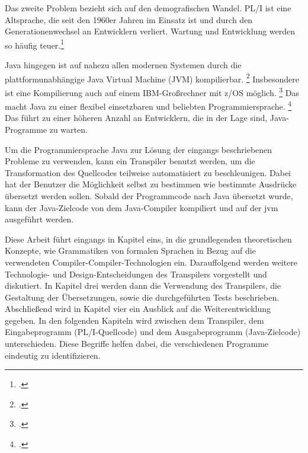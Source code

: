 Das zweite Problem bezieht sich auf den demografischen Wandel. PL/I ist eine Altsprache, die seit den 1960er Jahren im Einsatz ist und durch den Generationenwechsel an Entwicklern verliert. Wartung und Entwicklung werden so häufig teuer.\footcite[Vgl. ][S. 227ff.]{histopli} 

Java hingegen ist auf nahezu allen modernen Systemen durch die plattformunabhängige Java Virtual Machine (JVM) kompilierbar. \footcite[Vgl. ][]{jvm}
Insbesondere ist eine Kompilierung auch auf einem IBM-Großrechner mit z/OS möglich. \footcite[Vgl. ][]{zos} 
Das macht Java zu einer flexibel einsetzbaren und beliebten Programmiersprache. \footcite[Vgl. ][]{tiobe} Das führt zu einer höheren Anzahl an Entwicklern, die in der Lage sind, Java-Programme zu warten.

Um die Programmiersprache Java zur Lösung der eingangs beschriebenen Probleme zu verwenden, kann ein Transpiler benutzt werden, um die Transformation des Quellcodes teilweise automatisiert zu beschleunigen. 
Dabei hat der Benutzer die Möglichkeit selbst zu bestimmen wie bestimmte Ausdrücke übersetzt werden sollen. Sobald der Programmcode nach Java übersetzt wurde, kann der Java-Zielcode von dem Java-Compiler kompiliert und auf der \ac{jvm} ausgeführt werden.

Diese Arbeit führt eingangs in Kapitel eins, in die grundlegenden theoretischen Konzepte, wie Grammatiken von formalen Sprachen in Bezug auf die verwendeten Compiler-Compiler-Technologien ein. Darauffolgend werden weitere Technologie- und Design-Entscheidungen des Transpilers vorgestellt und diskutiert. In Kapitel drei werden dann die Verwendung des Transpilers, die Gestaltung der Übersetzungen, sowie die durchgeführten Tests beschrieben. Abschließend wird in Kapitel vier ein Ausblick auf die Weiterentwicklung gegeben.
In den folgenden Kapiteln wird zwischen dem Transpiler, dem Eingabeprogramm (PL/I-Quellcode) und dem Ausgabeprogramm (Java-Zielcode) unterschieden. Diese Begriffe helfen dabei, die verschiedenen Programme eindeutig zu identifizieren. 


     


